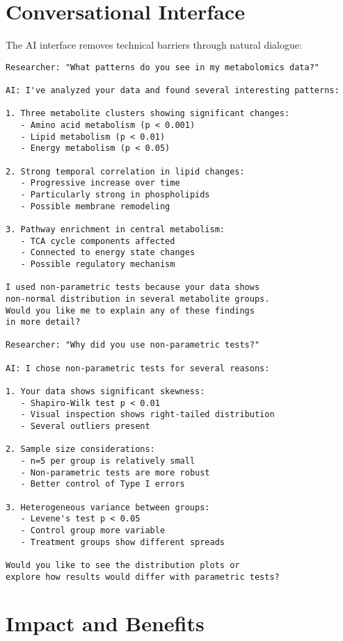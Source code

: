 \documentclass[11pt,a4paper]{article}
\begin{document}
\section{Conversational Interface}
The AI interface removes technical barriers through natural dialogue:

\begin{verbatim}
Researcher: "What patterns do you see in my metabolomics data?"

AI: I've analyzed your data and found several interesting patterns:

1. Three metabolite clusters showing significant changes:
   - Amino acid metabolism (p < 0.001)
   - Lipid metabolism (p < 0.01)
   - Energy metabolism (p < 0.05)

2. Strong temporal correlation in lipid changes:
   - Progressive increase over time
   - Particularly strong in phospholipids
   - Possible membrane remodeling

3. Pathway enrichment in central metabolism:
   - TCA cycle components affected
   - Connected to energy state changes
   - Possible regulatory mechanism

I used non-parametric tests because your data shows
non-normal distribution in several metabolite groups.
Would you like me to explain any of these findings
in more detail?

Researcher: "Why did you use non-parametric tests?"

AI: I chose non-parametric tests for several reasons:

1. Your data shows significant skewness:
   - Shapiro-Wilk test p < 0.01
   - Visual inspection shows right-tailed distribution
   - Several outliers present

2. Sample size considerations:
   - n=5 per group is relatively small
   - Non-parametric tests are more robust
   - Better control of Type I errors

3. Heterogeneous variance between groups:
   - Levene's test p < 0.05
   - Control group more variable
   - Treatment groups show different spreads

Would you like to see the distribution plots or
explore how results would differ with parametric tests?
\end{verbatim}

\section{Impact and Benefits}
\end{document}
